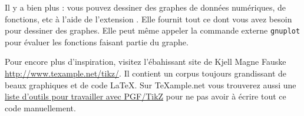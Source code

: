 Il y a bien plus : vous pouvez dessiner des graphes de données
numériques, de fonctions, etc à l'aide de l'extension
. Elle fournit tout ce dont vous avez besoin pour
dessiner des graphes. Elle peut même appeler la commande externe
\texttt{gnuplot} pour évaluer les fonctions faisant partie du graphe.

Pour encore plus d'inspiration, visitez l'ébahissant site de Kjell
Magne Fauske \url{http://www.texample.net/tikz/}. Il contient un
corpus toujours grandissant de beaux graphiques et de code \LaTeX{}.
Sur \TeX{}ample.net vous trouverez aussi une
\href{http://www.texample.net/tikz/resources/#tools-that-generate-pgftikz-code}{liste
d'outils pour travailler avec PGF/TikZ} pour ne pas avoir à écrire
tout ce code manuellement.


